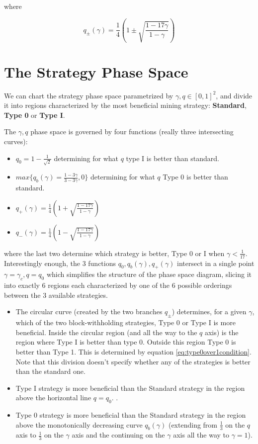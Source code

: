 \documentclass[letterpaper,12pt]{report}
\theoremstyle{plain}
\theoremstyle{definition}
\begin{document}
where 

\begin{equation}\label{qplusminus}
q_{\pm}(\gamma)=\frac{1}{4}\left(1\pm\sqrt{\frac{1-17\gamma}{1-\gamma}}\right)
\end{equation}


\section{The Strategy Phase Space}\label{sec:phasespace}

We can chart the strategy phase space parametrized by $\gamma,q\in [0,1]^2$, and divide it into regions characterized by the most beneficial mining strategy: \textbf{Standard}, \textbf{Type 0} or \textbf{Type I}.

The $\gamma, q$ phase space is governed by four functions (really three intersecting curves):
\begin{itemize}
\item $q_0= 1-\frac{1}{\sqrt{2}}$ determining for what $q$ type I is better than standard.
\item $max\lbrace q_b(\gamma)=\frac{1-3\gamma}{3-3\gamma},0\rbrace$ determining for what $q$ Type 0 is better than standard.
\item $q_+(\gamma)=\frac{1}{4}\left(1+\sqrt{\frac{1-17\gamma}{1-\gamma}}\right)$ 
\item $q_-(\gamma)=\frac{1}{4}\left(1-\sqrt{\frac{1-17\gamma}{1-\gamma}}\right)$
\end{itemize}
where the last two determine which strategy is better, Type 0 or I when $\gamma<\frac{1}{17}$.
Interestingly enough, the 3 functions $q_0, q_b(\gamma), q_+(\gamma)$ intersect in a single point $\gamma=\gamma_c, q=q_0$ which simplifies the structure of the phase space diagram, slicing it into exactly 6 regions each characterized by one of the 6 possible orderings between the 3 available strategies.

\begin{itemize}
\item The circular curve (created by the two branches $q_{\pm}$) determines, for a given $\gamma$, which of the two block-withholding strategies, Type 0 or Type I is more beneficial. Inside the circular region (and all the way to the $q$ axis) is the region where Type I is better than type 0. Outside this region Type 0 is better than Type 1. This is determined by equation \ref{eq:type0over1condition}. Note that this division doesn't specify whether any of the strategies is better than the standard one.
\item Type I strategy is more beneficial than the Standard strategy in the region above the horizontal line $q=q_0$. .
\item Type 0 strategy is more beneficial than the Standard strategy in the region above the monotonically decreasing curve $q_b(\gamma)$ (extending from $\frac{1}{3}$ on the $q$ axis to $\frac{1}{3}$ on the $\gamma$ axis and the continuing on the $\gamma$ axis all the way to $\gamma=1$).
\end{itemize}
\end{document}
